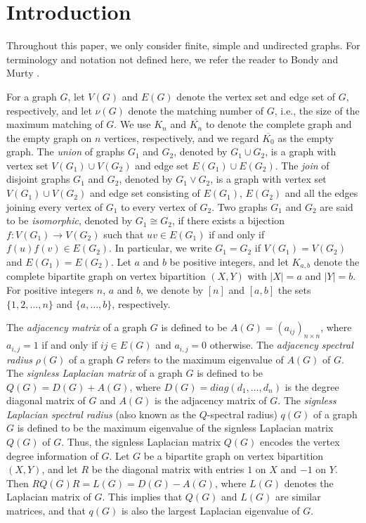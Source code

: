 \documentclass[11pt,a4paper]{article}
\theoremstyle{definition}
\numberwithin{equation}{section}
\begin{document}
\section{Introduction}
Throughout this paper, we only consider finite, simple and undirected graphs. For terminology and notation not defined here, we refer the reader to Bondy and Murty \cite{Bondy}.

For a graph $G$, let $V(G)$ and $E(G)$ denote the vertex set and edge set of $G$, respectively, and let $\nu(G)$ denote the matching number of $G$, i.e., the size of the maximum matching of $G$. We use $K_n$ and $\overline{K_n}$ to denote the complete graph and the empty graph on $n$ vertices, respectively, and we regard $\overline{K_0}$ as the empty graph. The \emph{union} of graphs ${G_1}$ and ${G_2}$, denoted by ${G_1}\cup {G_2}$, is a graph with vertex set ${V({G_1})}\cup {V({G_2})}$ and edge set ${E({G_1})}\cup {E({G_2})}$. The \emph{join} of disjoint graphs ${G_1}$ and ${G_2}$, denoted by ${G_1}\vee {G_2}$, is a graph with vertex set ${V({G_1})}\cup {V({G_2})}$ and edge set consisting of $E({G_1})$, $E({G_2})$ and all the edges joining every vertex of ${G_1}$ to every vertex of ${G_2}$. Two graphs ${G_1}$ and ${G_2}$ are said to be \emph{isomorphic}, denoted by
${G_1}\cong{G_2}$, if there exists a bijection $f:V({G_1})\to V({G_2})$ such that $uv\in E({G_1})$ if and only if $f(u)f(v)\in E({G_2})$. In particular, we write ${G_1}={G_2}$ if $V({G_1})=V({G_2})$ and $E({G_1})=E({G_2})$. Let $a$ and $b$ be positive integers, and let $K_{a,b}$ denote the complete bipartite graph on vertex bipartition $(X, Y)$ with $|X|=a$ and $|Y|=b$. For positive integers $n$, $a$ and $b$, we denote by $[n]$ and $[a,b]$ the sets $\{{1, 2,\ldots, n}\}$ and $\{{a,\ldots, b}\}$, respectively.

The \emph{adjacency matrix} of a graph $G$ is defined to be $A(G)={({a_{ij}})_{n\times n}}$, where ${a_{i,j}}=1$ if and only if $ij\in E(G)$ and ${a_{i,j}}=0$ otherwise. The \emph{adjacency spectral radius} $\rho(G)$ of a graph $G$ refers to the maximum eigenvalue of $A(G)$ of $G$. The \emph{signless Laplacian matrix} of a graph $G$ is defined to be $Q(G)=D(G)+A(G)$, where $D(G)=diag({{d_1}, \ldots, {d_n}})$ is the degree diagonal matrix of $G$ and $A(G)$ is the adjacency matrix of $G$. The \emph{signless Laplacian spectral radius} (also known as the $Q$-spectral radius) $q(G)$ of a graph $G$ is defined to be the maximum eigenvalue of the signless Laplacian matrix $Q(G)$ of $G$. Thus, the signless Laplacian matrix $Q(G)$ encodes the vertex degree information of $G$. Let $G$ be a bipartite graph on vertex bipartition $(X, Y)$, and let $R$ be the diagonal matrix with entries $1$ on $X$ and $-1$ on $Y$. Then $RQ(G)R=L(G)=D(G)-A(G)$, where $L(G)$ denotes the Laplacian matrix of $G$. This implies that $Q(G)$ and $L(G)$ are similar matrices, and that $q(G)$ is also the largest Laplacian eigenvalue of $G$.
\end{document}
